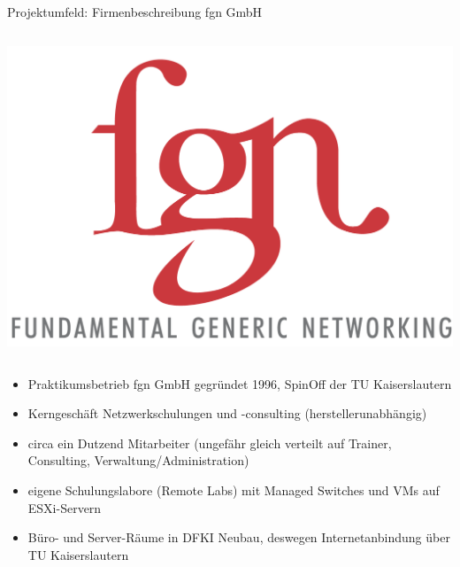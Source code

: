 \documentclass[handout,svgnames]{beamer}
\begin{document}
\subsection{}
\begin{frame}{Projektumfeld: Firmenbeschreibung fgn GmbH}
\begin{columns}[c]
	\begin{column}{2.5cm}
		\includegraphics[scale=0.7]{Bilder/logo_fgn.png}
	\end{column}
\end{columns}
\begin{itemize}
	\item Praktikumsbetrieb fgn GmbH gegründet 1996, SpinOff der TU Kaiserslautern
	\item Kerngeschäft Netzwerkschulungen und -consulting (herstellerunabhängig)
	\item circa ein Dutzend Mitarbeiter (ungefähr gleich verteilt auf Trainer, Consulting, Verwaltung/Administration)
	\item eigene Schulungslabore (Remote Labs) mit Managed Switches und VMs auf ESXi-Servern
	\item Büro- und Server-Räume in DFKI Neubau, deswegen Internetanbindung über TU Kaiserslautern
\end{itemize}
\end{frame}
\end{document}
